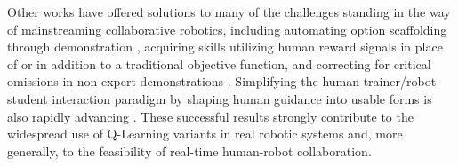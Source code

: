 \documentclass[letterpaper]{article}
\begin{document}
Other works have offered solutions to many of the challenges standing in the way of mainstreaming collaborative robotics, including automating option scaffolding through demonstration \cite{AutoSkillAcquisition}, acquiring skills utilizing human reward signals in place of \cite{TAMER} or in addition to \cite{TeacherRL} a traditional objective function, and correcting for critical omissions in non-expert demonstrations \cite{PerspectiveTaking}. Simplifying the human trainer/robot student interaction paradigm by shaping human guidance into usable forms is also rapidly advancing \cite{TAMER,Clicker,AdviceTaking,TeacherRL,DemonstrationRL}. These successful results strongly contribute to the widespread use of Q-Learning variants in real robotic systems and, more generally, to the feasibility of real-time human-robot collaboration.



\end{document}
